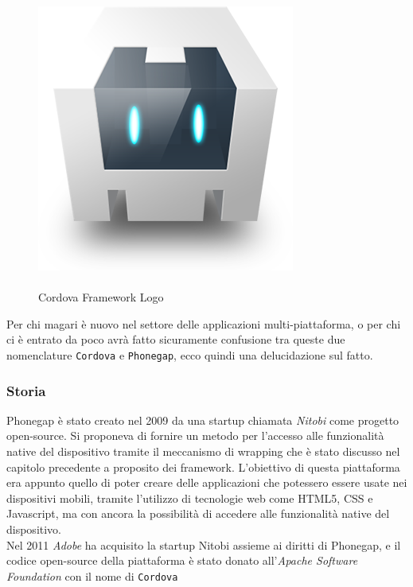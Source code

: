 \begin{figure}
  \vspace{-65pt}
  \begin{center}
    \includegraphics[scale=0.35]{Figures/cordova-logo.png}
  \end{center}
  \vspace{-10pt}
  \caption{\\Cordova Framework Logo}
  \label{fig:Cordova}
  \vspace{-30pt}
\end{figure}


Per chi magari è nuovo nel settore delle applicazioni multi-piattaforma, o per chi ci è entrato da poco 	avrà fatto sicuramente confusione tra queste due nomenclature \texttt{Cordova} e \texttt{Phonegap}, ecco quindi una delucidazione sul fatto.

\subsubsection{Storia}
Phonegap è stato creato nel 2009 da una startup chiamata \emph{Nitobi} come progetto open-source. Si proponeva di fornire un metodo per l'accesso alle funzionalità native del dispositivo tramite il meccanismo di wrapping che è stato discusso nel capitolo precedente a proposito dei framework. L'obiettivo di questa piattaforma era appunto quello di poter creare delle applicazioni che potessero essere usate nei dispositivi mobili, tramite l'utilizzo di tecnologie web come HTML5, CSS e Javascript, ma con ancora la possibilità di accedere alle funzionalità native del dispositivo.\\
Nel 2011 \emph{Adobe} ha acquisito la startup Nitobi assieme ai diritti di Phonegap, e il codice open-source della piattaforma è stato donato all'\emph{Apache Software Foundation} con il nome di \texttt{Cordova}

